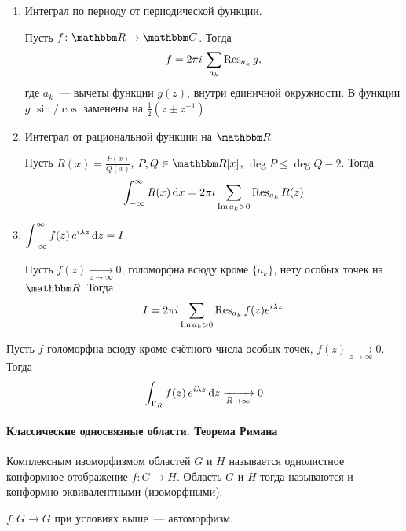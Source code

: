 \documentclass[12pt,timbord]{../../../notes}
\begin{document}
\begin{enumerate}[I$\rangle$]
  \item Интеграл по периоду от периодической функции. \par
    Пусть $f\colon \R \to \C$. Тогда
    \[
      f = 2\pi i \, \sum_{a_k} \operatorname{Res}_{a_k} g,
    \]
    где $a_k$~--- вычеты функции $g(z)$, внутри единичной окружности. В функции $g$ $\sin/\cos$
    заменены на $\frac{1}{2} \left(z \pm z^{-1}\right)$ 
  \item Интеграл от рациональной функции на $\R$ \par
    Пусть $R(x) = \frac{P(x)}{Q(x)}$, $P, Q \in \R[x]$, $\deg P \leqslant \deg Q-2 $.  Тогда 
    \[
      \int_{-\infty}^{\infty} R(x) \,\mathrm{d} x= 2 \pi i \sum_{\operatorname{Im} a_k > 0} \operatorname{Res}_{a_k} R(z)
    \]
  \item $\displaystyle \int_{-\infty}^{\infty} f(z) \, e^{i \lambda z} \, \mathrm{d} z = I$ \par
  Пусть $f(z) \xrightarrow[z\to \infty]{}  0$, голоморфна всюду кроме $\{a_k\}$, нету особых точек
  на $\R$. Тогда
  \[
    I = 2 \pi i \sum_{\operatorname{Im} a_k > 0} \operatorname{Res}_{a_k} f(z) e^{i\lambda z}
  \]
\end{enumerate}

\begin{lem}[Жордана]\label{lem:tfcv::intresidue::jordan}
  Пусть $f$ голоморфна всюду кроме счётного числа особых точек, $f(z) \xrightarrow[z\to \infty]{}  0$.
  Тогда
  \[
    \int_{\Gamma_R} f(z) \, e^{i \lambda z} \, \mathrm{d} z \xrightarrow[R \to \infty]{} 0
  \]
\end{lem}

\setcounter{paragraph}{54}
\paragraph{Классические односвязные области. Теорема Римана}
\label{par:tfcv::riemanaut}

\begin{defn}\label{defn:tfcv::riemanaut::isom}
  Комплексным изоморфизмом областей $G$ и $H$ называется однолистное конформное отображение
  $f \colon G \to H$. Область $G$ и $H$ тогда называются и конформно эквивалентными (изоморфными).
\end{defn}
\begin{rem*}
  $f\colon G \to G$ при условиях выше~--- автоморфизм.
\end{rem*}
\end{document}
